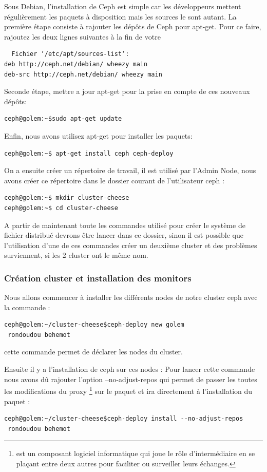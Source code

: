 \documentclass[12pt]{article}
\begin{document}
Sous Debian, l'installation de Ceph est simple car les développeurs mettent régulièrement les paquets à disposition mais les sources le sont autant.
La première étape consiste à rajouter les dépôts de Ceph pour apt-get.
Pour ce faire, rajoutez les deux lignes suivantes à la fin de votre
\begin{verbatim}
  Fichier ‘/etc/apt/sources-list’:
deb http://ceph.net/debian/ wheezy main
deb-src http://ceph.net/debian/ wheezy main
\end{verbatim} 
Seconde étape,  mettre a jour apt-get pour la prise en compte de ces nouveaux dépôts:
\begin{verbatim}
ceph@golem:~$sudo apt-get update
\end{verbatim}

Enfin, nous avons utilisez apt-get pour installer les paquets:
\begin{verbatim}
ceph@golem:~$ apt-get install ceph ceph-deploy
\end{verbatim}

On a ensuite créer un répertoire de travail, il est utilisé par l'Admin Node, nous avons créer ce répertoire dans le dossier courant de l'utilisateur ceph :
\begin{verbatim}
ceph@golem:~$ mkdir cluster-cheese
ceph@golem:~$ cd cluster-cheese
\end{verbatim}

A partir de maintenant toute les commandes utilisé pour créer le système de fichier distribué devrons être lancer dans ce dossier, sinon il est possible que l'utilisation d'une de ces commandes créer un deuxième cluster et des problèmes surviennent, si les 2 cluster ont le même nom.

\subsubsection{Création cluster et installation des monitors}

Nous allons commencer à installer les différents nodes de notre cluster ceph avec la commande :
\begin{verbatim}
ceph@golem:~/cluster-cheese$ceph-deploy new golem
 rondoudou behemot
\end{verbatim}

cette commande permet de déclarer les nodes du cluster.

Ensuite il y a l'installation de ceph sur ces nodes :
Pour lancer cette commande nous avons dû rajouter l'option --no-adjust-repos qui permet de passer les toutes les modifications du proxy \footnote{est un composant logiciel informatique qui joue le rôle d'intermédiaire en se plaçant entre deux autres pour faciliter ou surveiller leurs échanges.} sur le paquet et ira directement à l'installation du paquet :
\begin{verbatim}
ceph@golem:~/cluster-cheese$ceph-deploy install --no-adjust-repos
 rondoudou behemot 
\end{verbatim}
\end{document}

